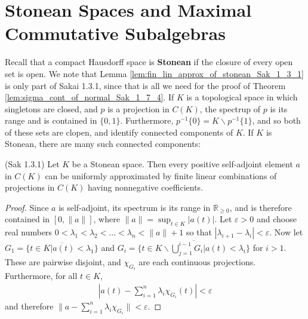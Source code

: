 \chapter{Stonean Spaces and Maximal Commutative Subalgebras}

Recall that a compact Hausdorff space is \textbf{Stonean} if the closure of every open set is open. We note that Lemma
\ref{lem:fin_lin_approx_of_stonean_Sak_1_3_1} is only part of Sakai 1.3.1, since that is all
we need for the proof of Theorem \ref{lem:sigma_cont_of_normal_Sak_1_7_4}. If $K$ is a topological space in which singletons are closed,
and $p$ is a projection in $C(K)$, the spectrup of $p$ is its range and is contained in $\{0,1\}$.
Furthermore, $p^{-1}\{0\}=K\backslash p^{-1}\{1\}$, and so both of these sets are clopen, and identify connected components of $K$.
If $K$ is Stonean, there are many such connected components:

\begin{lemma}
  \label{lem:fin_lin_approx_of_stonean_Sak_1_3_1} (Sak 1.3.1)
  \leanok
  Let $K$ be a Stonean space. Then every positive self-adjoint element $a$ in $C(K)$ can be uniformly approximated by
  finite linear combinations of projections in $C(K)$ having nonnegative coefficients.
\end{lemma}

\begin{proof}
  \leanok
Since $a$ is self-adjoint, its spectrum is its range in $\mathbb{R}_{\ge 0}$, and is therefore contained in $[0, \|a\|]$,
where $\|a\|=\sup_{t\in K}|a(t)|$. Let $\varepsilon >0$ and choose real numbers
$0<\lambda_1<\lambda_2<\ldots<\lambda_n < \|a\|+1$ so that $|\lambda_{i+1}-\lambda_{i}|<\varepsilon$.
Now let $G_1= \overline{\{t\in K | a(t)<\lambda_1\}}$ and $G_i=\overline{\{t\in K
\backslash\bigcup_{j=1}^{i-1}G_{i}|a(t)<\lambda_i\}}$ for $i>1$. These are pairwise disjoint,
and $\chi_{G_{i}}$ are each continuous projections. Furthermore, for all $t\in K$,
\begin{align}
    |a(t)-\sum_{i=1}^{n}\lambda_i\chi_{G_{i}}(t)|<\varepsilon
\end{align}
and therefore $\|a-\sum_{i=1}^{n}\lambda_i\chi_{G_{i}}\|<\varepsilon$.
\end{proof}

